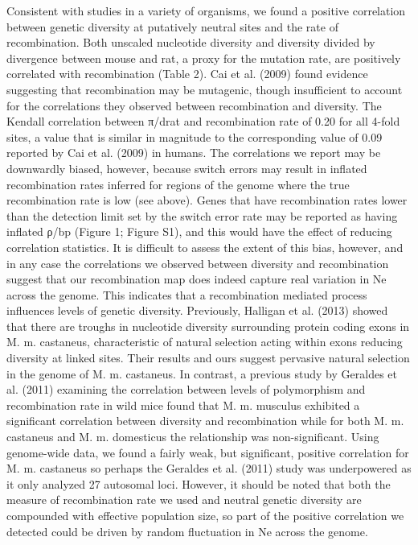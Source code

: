 	Consistent with studies in a variety of organisms, we found a positive correlation between genetic diversity at putatively neutral sites and the rate of recombination. Both unscaled nucleotide diversity and diversity divided by divergence between mouse and rat, a proxy for the mutation rate, are positively correlated with recombination (Table 2). Cai et al. (2009) found evidence suggesting that recombination may be mutagenic, though insufficient to account for the correlations they observed between recombination and diversity. The Kendall correlation between π/drat and recombination rate of 0.20 for all 4-fold sites, a value that is similar in magnitude to the corresponding value of 0.09 reported by Cai et al. (2009) in humans. The correlations we report may be downwardly biased, however, because switch errors may result in inflated recombination rates inferred for regions of the genome where the true recombination rate is low (see above). Genes that have recombination rates lower than the detection limit set by the switch error rate may be reported as having inflated ρ/bp (Figure 1; Figure S1), and this would have the effect of reducing correlation statistics. It is difficult to assess the extent of this bias, however, and in any case the correlations we observed between diversity and recombination suggest that our recombination map does indeed capture real variation in Ne across the genome. This indicates that a recombination mediated process influences levels of genetic diversity. Previously, Halligan et al. (2013) showed that there are troughs in nucleotide diversity surrounding protein coding exons in M. m. castaneus, characteristic of natural selection acting within exons reducing diversity at linked sites. Their results and ours suggest pervasive natural selection in the genome of M. m. castaneus. In contrast, a previous study by Geraldes et al. (2011) examining the correlation between levels of polymorphism and recombination rate in wild mice found that M. m. musculus exhibited a significant correlation between diversity and recombination while for both M. m. castaneus and M. m. domesticus the relationship was non-significant. Using genome-wide data, we found a fairly weak, but significant, positive correlation for M. m. castaneus so perhaps the Geraldes et al. (2011) study was underpowered as it only analyzed 27 autosomal loci. However, it should be noted that both the measure of recombination rate we used and neutral genetic diversity are compounded with effective population size, so part of the positive correlation we detected could be driven by random fluctuation in Ne across the genome.

